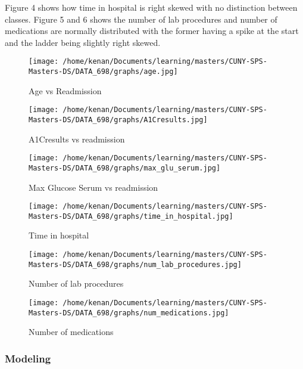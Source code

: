 \documentclass[5p]{elsarticle} %
\begin{document}
Figure 4 shows how time in hospital is right skewed with no distinction
between classes. Figure 5 and 6 shows the number of lab procedures and
number of medications are normally distributed with the former having a
spike at the start and the ladder being slightly right skewed.

\begin{figure}
\hypertarget{id}{%
\centering
\texttt{[image: /home/kenan/Documents/learning/masters/CUNY-SPS-Masters-DS/DATA\_698/graphs/age.jpg]}
\caption{Age vs Readmission}\label{id}
}
\end{figure}

\begin{figure}
\hypertarget{id}{%
\centering
\texttt{[image: /home/kenan/Documents/learning/masters/CUNY-SPS-Masters-DS/DATA\_698/graphs/A1Cresults.jpg]}
\caption{A1Cresults vs readmission}\label{id}
}
\end{figure}

\begin{figure}
\hypertarget{id}{%
\centering
\texttt{[image: /home/kenan/Documents/learning/masters/CUNY-SPS-Masters-DS/DATA\_698/graphs/max\_glu\_serum.jpg]}
\caption{Max Glucose Serum vs readmission}\label{id}
}
\end{figure}

\begin{figure}
\hypertarget{id}{%
\centering
\texttt{[image: /home/kenan/Documents/learning/masters/CUNY-SPS-Masters-DS/DATA\_698/graphs/time\_in\_hospital.jpg]}
\caption{Time in hospital}\label{id}
}
\end{figure}

\begin{figure}
\hypertarget{id}{%
\centering
\texttt{[image: /home/kenan/Documents/learning/masters/CUNY-SPS-Masters-DS/DATA\_698/graphs/num\_lab\_procedures.jpg]}
\caption{Number of lab procedures}\label{id}
}
\end{figure}

\begin{figure}
\hypertarget{id}{%
\centering
\texttt{[image: /home/kenan/Documents/learning/masters/CUNY-SPS-Masters-DS/DATA\_698/graphs/num\_medications.jpg]}
\caption{Number of medications}\label{id}
}
\end{figure}

\hypertarget{modeling}{%
\subsubsection{Modeling}\label{modeling}}
\end{document}
